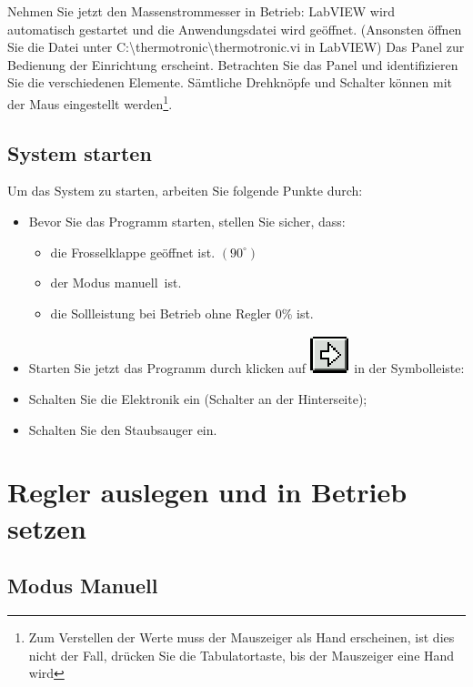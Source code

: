 \documentclass[a4paper,10pt,oneside]{article}
\begin{document}
Nehmen Sie jetzt den Massenstrommesser in Betrieb:
LabVIEW wird automatisch gestartet und die Anwendungsdatei wird geöffnet. (Ansonsten öffnen Sie die Datei unter C:\textbackslash thermotronic\textbackslash thermotronic.vi in LabVIEW)
Das Panel zur Bedienung der Einrichtung erscheint. Betrachten Sie das Panel und identifizieren Sie die verschiedenen Elemente. Sämtliche Drehknöpfe und Schalter können mit der Maus eingestellt werden\footnote{Zum Verstellen der Werte muss der Mauszeiger als Hand erscheinen, ist dies nicht der Fall, drücken Sie die Tabulatortaste, bis der Mauszeiger eine Hand wird}.

\subsection{System starten}
Um das System zu starten, arbeiten Sie folgende Punkte durch:
\begin{itemize}
\item Bevor Sie das Programm starten, stellen Sie sicher, dass:
\begin{itemize}
\item die Frosselklappe geöffnet ist. $(90^\circ)$
\item der Modus \glqq manuell\grqq \, ist.
\item die Sollleistung bei Betrieb ohne Regler 0\% ist.
\end{itemize}

\item Starten Sie jetzt das Programm durch klicken auf \includegraphics{img/arrow.eps} in der Symbolleiste:

\item Schalten Sie die Elektronik ein (Schalter an der Hinterseite);

\item Schalten Sie den Staubsauger ein.

\end{itemize}


\section{Regler auslegen und in Betrieb setzen}

\subsection{Modus \glqq Manuell\grqq}
\end{document}
